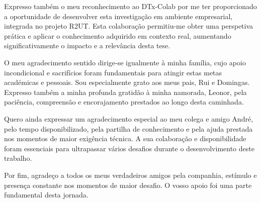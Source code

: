 Expresso também o meu reconhecimento ao DTx-Colab por me ter proporcionado a oportunidade de desenvolver esta investigação em ambiente empresarial, integrada no projeto R2UT. Esta colaboração permitiu-me obter uma perspetiva prática e aplicar o conhecimento adquirido em contexto real, aumentando significativamente o impacto e a relevância desta tese.

O meu agradecimento sentido dirige-se igualmente à minha família, cujo apoio incondicional e sacrifícios foram fundamentais para atingir estas metas académicas e pessoais. Sou especialmente grato aos meus pais, Rui e Domingas. Expresso também a minha profunda gratidão à minha namorada, Leonor, pela paciência, compreensão e encorajamento prestados ao longo desta caminhada.

Quero ainda expressar um agradecimento especial ao meu colega e amigo André, pelo tempo disponibilizado, pela partilha de conhecimento e pela ajuda prestada nos momentos de maior exigência técnica. A sua colaboração e disponibilidade foram essenciais para ultrapassar vários desafios durante o desenvolvimento deste trabalho.

Por fim, agradeço a todos os meus verdadeiros amigos pela companhia, estímulo e presença constante nos momentos de maior desafio. O vosso apoio foi uma parte fundamental desta jornada.

\setlength{\parskip}{0em}